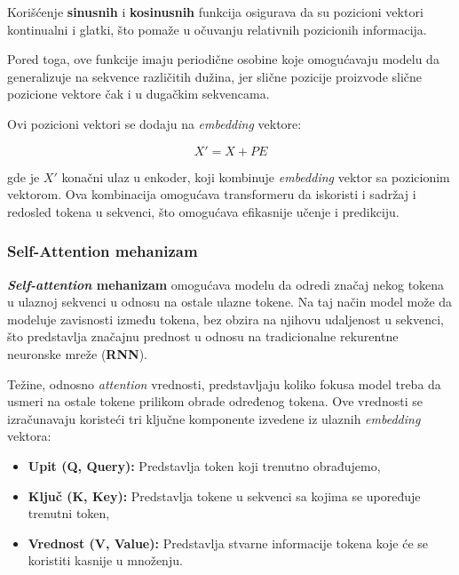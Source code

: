 \documentclass[12pt]{article}
\begin{document}
   Korišćenje \textbf{sinusnih} i \textbf{kosinusnih} funkcija osigurava da su pozicioni vektori
   kontinualni i glatki, što pomaže u očuvanju relativnih pozicionih informacija. 
   
   Pored toga, ove funkcije imaju periodične osobine koje omogućavaju modelu da 
   generalizuje na sekvence različitih dužina, jer slične pozicije proizvode slične 
   pozicione vektore čak i u dugačkim sekvencama.

   Ovi pozicioni vektori se dodaju na \textit{embedding} vektore:

   \[
   X' = X + PE
   \]

   gde je \(X'\) konačni ulaz u enkoder, koji kombinuje \textit{embedding} vektor 
   sa pozicionim vektorom. Ova kombinacija omogućava transformeru da 
   iskoristi i sadržaj i redosled tokena u sekvenci, što omogućava efikasnije 
   učenje i predikciju.

   \subsubsection*{Self-Attention mehanizam}
   \textbf{\textit{Self-attention} mehanizam} omogućava modelu da odredi značaj nekog 
   tokena u ulaznoj sekvenci u odnosu na ostale ulazne tokene. 
   Na taj način model može da modeluje zavisnosti između tokena, bez obzira na 
   njihovu udaljenost u sekvenci, što predstavlja značajnu prednost u odnosu na 
   tradicionalne rekurentne neuronske mreže (\textbf{RNN}).
 
   Težine, odnosno \textit{attention} vrednosti, predstavljaju koliko fokusa model treba 
   da usmeri na ostale tokene prilikom obrade određenog tokena. 
   Ove vrednosti se izračunavaju koristeći tri ključne komponente izvedene 
   iz ulaznih \textit{embedding} vektora:

   \begin{itemize}
      \item \textbf{Upit (Q, Query):} Predstavlja token koji trenutno obrađujemo,
      \item \textbf{Ključ (K, Key):} Predstavlja tokene u sekvenci sa kojima 
      se upoređuje trenutni token,
      \item \textbf{Vrednost (V, Value):} Predstavlja stvarne informacije tokena koje 
      će se koristiti kasnije u množenju.
  \end{itemize}
  
  \newpage
\end{document}
